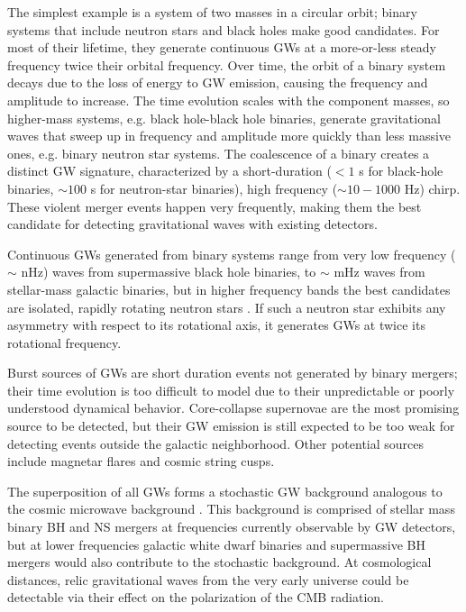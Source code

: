 The simplest example is a system of two masses in a circular orbit; binary systems that include neutron stars and black holes make good candidates. For most of their lifetime, they generate continuous \acp{GW} at a more-or-less steady frequency twice their orbital frequency. Over time, the orbit of a binary system decays due to the loss of energy to \ac{GW} emission, causing the frequency and amplitude to increase. The time evolution scales with the component masses, so higher-mass systems, e.g. black hole-black hole binaries, generate gravitational waves that sweep up in frequency and amplitude more quickly than less massive ones, e.g. binary neutron star systems.  The coalescence of a binary creates a distinct \ac{GW} signature, characterized by a short-duration ($<1$ s for black-hole binaries, $\sim100$ s for neutron-star binaries), high frequency ($\sim10-1000$ Hz) chirp. These violent merger events happen very frequently, making them the best candidate for detecting gravitational waves with existing detectors.

Continuous \acp{GW} generated from binary systems range from very low frequency ($\sim$ nHz) waves from supermassive black hole binaries, to $\sim$ mHz waves from stellar-mass galactic binaries, but in higher frequency bands the best candidates are isolated, rapidly rotating neutron stars \cite{Riles_2017}. If such a neutron star exhibits any asymmetry with respect to its rotational axis, it generates \acp{GW} at twice its rotational frequency.

Burst sources of \acp{GW} are short duration events not generated by binary mergers; their time evolution is too difficult to model due to their unpredictable or poorly understood dynamical behavior. Core-collapse supernovae are the most promising source to be detected, but their \ac{GW} emission is still expected to be too weak for detecting events outside the galactic neighborhood. Other potential sources include magnetar flares and cosmic string cusps.

The superposition of all \acp{GW} forms a stochastic \ac{GW} background analogous to the cosmic microwave background \cite{romano2019searches}. This background is comprised of stellar mass binary BH and NS mergers at frequencies currently observable by \ac{GW} detectors, but at lower frequencies galactic white dwarf binaries and supermassive BH mergers would also contribute to the stochastic background. At cosmological distances, relic gravitational waves from the very early universe could be detectable via their effect on the polarization of the CMB radiation.
